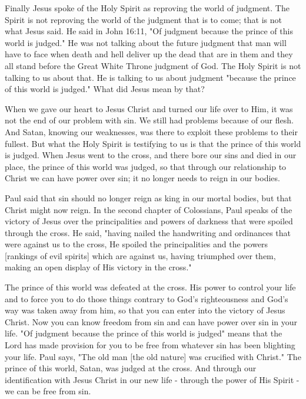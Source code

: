 Finally Jesus spoke of the Holy Spirit as reproving the world of judgment. The Spirit is not reproving the world of the judgment that is to come; that is not what Jesus said. He said in John 16:11, "Of judgment because the prince of this world is judged." He was not talking about the future judgment that man will have to face when death and hell deliver up the dead that are in them and they all stand before the Great White Throne judgment of God. The Holy Spirit is not talking to us about that. He is talking to us about judgment "because the prince of this world is judged." What did Jesus mean by that? 

When we gave our heart to Jesus Christ and turned our life over to Him, it was not the end of our problem with sin. We still had problems because of our flesh. And Satan, knowing our weaknesses, was there to exploit these problems to their fullest. But what the Holy Spirit is testifying to us is that the prince of this world is judged. When Jesus went to the cross, and there bore our sins and died in our place, the prince of this world was judged, so that through our relationship to Christ we can have power over sin; it no longer needs to reign in our bodies. 

Paul said that sin should no longer reign as king in our mortal bodies, but that Christ might now reign. In the second chapter of Colossians, Paul speaks of the victory of Jesus over the principalities and powers of darkness that were spoiled through the cross. He said, "having nailed the handwriting and ordinances that were against us to the cross, He spoiled the principalities and the powers [rankings of evil spirits] which are against us, having triumphed over them, making an open display of His victory in the cross." 

The prince of this world was defeated at the cross. His power to control your life and to force you to do those things contrary to God's righteousness and God's way was taken away from him, so that you can enter into the victory of Jesus Christ. Now you can know freedom from sin and can have power over sin in your life. "Of judgment because the prince of this world is judged" means that the Lord has made provision for you to be free from whatever sin has been blighting your life. Paul says, "The old man [the old nature] was crucified with Christ." The prince of this world, Satan, was judged at the cross. And through our identification with Jesus Christ in our new life - through the power of His Spirit - we can be free from sin. 

